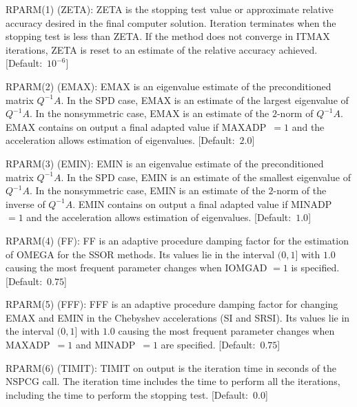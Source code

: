 \begin{list}{}{
               \leftmargin 1.00in \rightmargin 0.25in}
\item[RPARM(1) \hfill](ZETA):
         ZETA is the stopping test value or approximate relative
         accuracy desired in the final computer solution.  Iteration
         terminates when the stopping test is less than ZETA.  If
         the method does not converge in ITMAX iterations, ZETA is
         reset to an estimate of the relative accuracy achieved.
         \mbox{[Default:  $10^{-6}$]}
 
\item[RPARM(2) \hfill](EMAX):
         EMAX is an eigenvalue estimate of the preconditioned matrix
         $Q^{-1}A$.  In the SPD case, EMAX is an estimate of the largest 
         eigenvalue of $Q^{-1}A$.  In the nonsymmetric case, EMAX is an 
         estimate of the $2$-norm of $Q^{-1}A$.  EMAX contains on output 
         a final adapted value if MAXADP~$= 1$ and the acceleration allows 
         estimation of eigenvalues. \mbox{[Default: $2.0$]}
 
\item[RPARM(3) \hfill](EMIN):
         EMIN is an eigenvalue estimate of the preconditioned matrix
         $Q^{-1}A$.  In the SPD case, EMIN is an estimate of the smallest
         eigenvalue of $Q^{-1}A$.  In the nonsymmetric case, EMIN is an 
         estimate of the $2$-norm of the inverse of $Q^{-1}A$. 
         EMIN contains on output a final adapted value if 
         MINADP~$= 1$ and the acceleration allows estimation of 
         eigenvalues. \mbox{[Default: $1.0$]}
 
\item[RPARM(4) \hfill](FF):
         FF is an adaptive procedure damping factor for the estimation
         of OMEGA for the SSOR methods.  Its values lie in the interval
         $(0,1]$ with $1.0$ causing the most frequent parameter
         changes when IOMGAD $= 1$ is specified. \mbox{[Default: $0.75$]}
 
\item[RPARM(5) \hfill](FFF):
         FFF is an adaptive procedure damping factor for changing
         EMAX and EMIN in the Chebyshev accelerations (SI and SRSI).
         Its values lie in the interval $(0,1]$ with $1.0$ causing the
         most frequent parameter changes when MAXADP~$= 1$ and
         MINADP~$= 1$ are specified. \mbox{[Default: $0.75$]}
 
\item[RPARM(6) \hfill](TIMIT):
         TIMIT on output is the iteration time in seconds of the
         NSPCG call.  The iteration time includes the time to perform
         all the iterations, including the time to perform the
         stopping test.  \mbox{[Default: $0.0$]}
 

\end{list}
